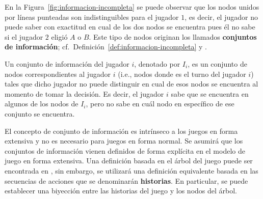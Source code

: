En la Figura~\ref{fig:informacion-incompleta} se puede observar que los nodos unidos por líneas punteadas son indistinguibles para el jugador $1$, es decir, el jugador no puede saber con exactitud en cual de los dos nodos se encuentra pues él no sabe si el jugador $2$ eligió $A$ o $B$. Este tipo de nodos originan los llamados \textbf{conjuntos de información}; cf.\ Definición~\ref{def:informacion-incompleta} y \cite[p.~200]{bib:course-game-theory}.

Un conjunto de información del jugador $i$, denotado por $I_i$, es un conjunto de nodos correspondientes al jugador $i$ (i.e., nodos donde es el turno del jugador $i$) tales que dicho jugador no puede distinguir en cual de esos nodos se encuentra al momento de tomar la decisión. Es decir, el jugador $i$ sabe que se encuentra en algunos de los nodos de $I_i$, pero no sabe en cuál nodo en específico de ese conjunto se encuentra.

El concepto de conjunto de información es intrínseco a los juegos en forma extensiva y no es necesario para juegos en forma normal. Se asumirá que los conjuntos de información vienen definidos de forma explícita en el modelo de juego en forma extensiva. Una definición basada en el árbol del juego puede ser encontrada en \cite{bib:conceptos-basicos}, sin embargo, se utilizará una definición equivalente basada en las secuencias de acciones que se denominarán \textbf{historias}. En particular, se puede establecer una biyección entre las historias del juego y los nodos del árbol.

